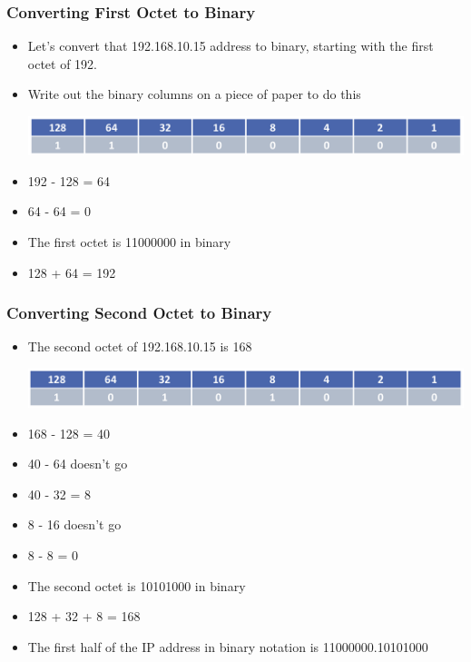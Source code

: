\documentclass[pdflatex,compress]{beamer}
\begin{document}
\begin{frame}
	\frametitle{Converting First Octet to Binary}
	\begin{itemize}
		\item Let’s convert that 192.168.10.15 address to binary, starting with the first octet of 192.
		\item Write out the binary columns on a piece of paper to do this

		\begin{center}
			\includegraphics[width=\linewidth]{img/img20}
		\end{center}
	
		\item 192 - 128 = 64
		\item 64 - 64 = 0
		\item The first octet is 11000000 in binary
		\item 128 + 64 = 192
	\end{itemize}	
\end{frame}

\begin{frame}
	\frametitle{Converting Second Octet to Binary}
	\begin{itemize}
		\item The second octet of 192.168.10.15 is 168
		
		\begin{center}
			\includegraphics[width=\linewidth]{img/img21}
		\end{center}
		
		\item 168 - 128 = 40
		\item 40 - 64 doesn’t go
		\item 40 - 32 = 8
		\item 8 - 16 doesn’t go
		\item 8 - 8 = 0
		\item The second octet is 10101000 in binary
		\item 128 + 32 + 8 = 168
		\item The first half of the IP address in binary notation is 11000000.10101000
	\end{itemize}	
\end{frame}
\end{document}
